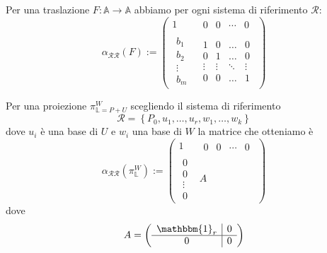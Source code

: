 \documentclass[11pt]{scrartcl}
\begin{document}
   	 \begin{example}
   	 	Per una traslazione $F:\mathbb{A}\to\mathbb{A}$ abbiamo per ogni sistema di riferimento $\mathcal{R}$:
   	 	$$\alpha_{\mathcal{R}\mathcal{R}}(F):=\left(\begin{array}{c|c}
   	 		1 & \begin{array}{cccc} 
   	 			0 & 0 & \cdots & 0
   	 		\end{array} \\
   	 		\hline
   	 		\begin{array}{c}
   	 			b_1 \\
   	 			b_2 \\
   	 			\vdots \\
   	 			b_m
   	 		\end{array} & \begin{array}{cccc}
   	 		1 & 0 & \dots & 0 \\
   	 		0 & 1 & \dots & 0 \\
   	 		\vdots & \vdots & \ddots & \vdots \\
   	 		0 & 0 & \dots & 1
   	 		\end{array}
   	 	\end{array}\right)$$
   	 \end{example}
   	 \begin{example}
   	 	Per una proiezione $\pi_{\mathbb{L}=P+U}^W$ scegliendo il sistema di riferimento
   	 	$$\mathcal{R}=\left\{P_0,u_1,\dots,u_r,w_1,\dots,w_k\right\}$$
   	 	dove $u_i$ è una base di $U$ e $w_i$ una base di $W$ la matrice che otteniamo è
   	 	$$\alpha_{\mathcal{R}\mathcal{R}}\left(\pi_{\mathbb{L}}^W\right):=\left(\begin{array}{c|c}
   	 		1 & \begin{array}{cccc} 
   	 			0 & 0 & \cdots & 0
   	 		\end{array} \\
   	 		\hline
   	 		\begin{array}{c}
   	 			0 \\
   	 			0 \\
   	 			\vdots \\
   	 			0
   	 		\end{array} & A
   	 	\end{array}\right)$$
   	 	dove 
   	 	$$A=\left(\begin{array}{c|c}
   	 		\mathbbm{1}_r & 0 \\
   	 		\hline
   	 		0 & 0
   	 	\end{array}\right)$$
   	 \end{example}
\end{document}
